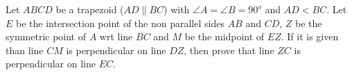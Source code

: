 Let $ABCD$ be a trapezoid ($AD\parallel BC$) with $\angle A=\angle B= 90^o$ and $AD<BC$. Let $E$ be the intersection point of the non parallel sides $AB$ and $CD$,  $Z$ be the symmetric point of $A$ wrt line $BC$ and $M$ be the midpoint of $EZ$. If it is given than line $CM$ is perpendicular on line $DZ$, then prove that line $ZC$ is perpendicular on line $EC$.

